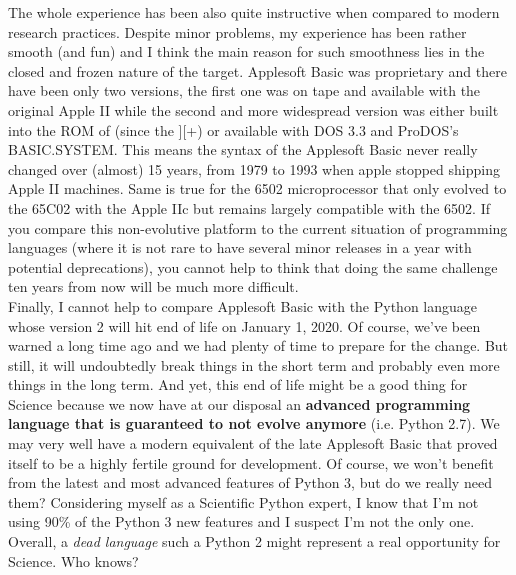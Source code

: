 The whole experience has been also quite instructive when compared to modern
research practices. Despite minor problems, my experience has been rather
smooth (and fun) and I think the main reason for such smoothness lies in the
closed and frozen nature of the target. Applesoft Basic was proprietary and
there have been only two versions, the first one was on tape and available with
the original Apple II while the second and more widespread version was either
built into the ROM of (since the ][+) or available with DOS 3.3 and ProDOS's
BASIC.SYSTEM. This means the syntax of the Applesoft Basic never really changed
over (almost) 15 years, from 1979 to 1993 when apple stopped shipping Apple II
machines. Same is true for the 6502 microprocessor that only evolved to the
65C02 with the Apple IIc but remains largely compatible with the 6502. If you
compare this non-evolutive platform to the current situation of programming
languages (where it is not rare to have several minor releases in a year with
potential deprecations), you cannot help to think that doing the same challenge
ten years from now will be much more difficult.\\

Finally, I cannot help to compare Applesoft Basic with the Python language
whose version 2 will hit end of life on January 1, 2020. Of course, we've been
warned a long time ago and we had plenty of time to prepare for the change. But
still, it will undoubtedly break things in the short term and probably even more
things in the long term. And yet, this end of life might be a good thing for
Science because we now have at our disposal an \textbf{advanced programming
language that is guaranteed to not evolve anymore} (i.e. Python 2.7). We may
very well have a modern equivalent of the late Applesoft Basic that proved
itself to be a highly fertile ground for development. Of course, we won't
benefit from the latest and most advanced features of Python 3, but do we
really need them?  Considering myself as a Scientific Python expert, I know
that I'm not using 90\% of the Python 3 new features and I suspect I'm not the
only one. Overall, a {\em dead language} such a Python 2 might represent a real
opportunity for Science. Who knows?


